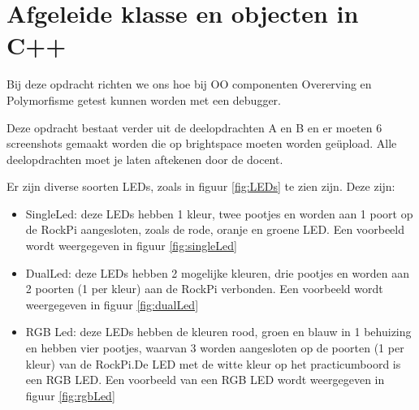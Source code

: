\chapter{Afgeleide klasse en objecten in C++}

Bij deze opdracht richten we ons hoe bij OO componenten Overerving en Polymorfisme getest kunnen worden met een debugger.

Deze opdracht bestaat verder uit de deelopdrachten A en B en er moeten 6 screenshots gemaakt worden die op brightspace moeten worden geüpload. Alle deelopdrachten moet je laten aftekenen door de docent.

Er zijn diverse soorten LEDs, zoals in figuur \ref{fig:LEDs} te zien zijn. Deze zijn:
\begin{itemize}
	\item SingleLed: deze LEDs hebben 1 kleur, twee pootjes en worden aan 1 poort op de RockPi aangesloten, zoals de rode, oranje en groene LED. Een voorbeeld wordt weergegeven in figuur \ref{fig:singleLed}
	\item DualLed: deze LEDs hebben 2 mogelijke kleuren, drie pootjes en worden aan 2 poorten (1 per kleur) aan de RockPi verbonden. Een voorbeeld wordt weergegeven in figuur \ref{fig:dualLed}
	\item RGB Led: deze LEDs hebben de kleuren rood, groen en blauw in 1 behuizing en hebben vier pootjes, waarvan 3 worden aangesloten op de poorten (1 per kleur) van de RockPi.De LED met de witte kleur op het practicumboord is een RGB LED. Een voorbeeld van een RGB LED wordt weergegeven in figuur \ref{fig:rgbLed}
\end{itemize}

